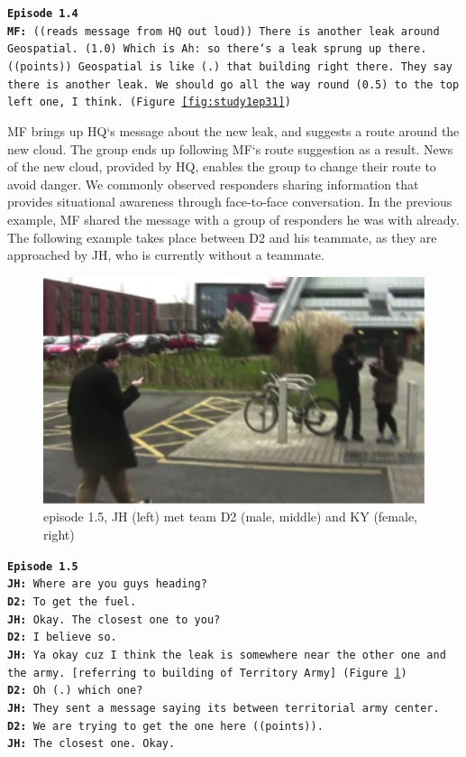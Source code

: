 \noindent
\texttt{\textbf{Episode 1.4}\\
\textbf{MF:} ((reads message from HQ out loud)) There is another leak around Geospatial. (1.0) Which is Ah: so there`s a leak sprung up there. ((points)) Geospatial is like (.) that building right there. They say there is another leak. We should go all the way round (0.5) to the top left one, I think. (Figure \ref{fig:study1ep31})\\
}

MF brings up HQ`s message about the new leak, and suggests a route around the new cloud. The group ends up following MF`s route suggestion as a result. News of the new cloud, provided by HQ, enables the group to change their route to avoid danger. We commonly observed responders sharing information that provides situational awareness through face-to-face conversation. In the previous example, MF shared the message with a group of responders he was with already. The following example takes place between D2 and his teammate, as they are approached by JH, who is currently without a teammate.\\

\begin{figure}[h]
  \centering
  \includegraphics[width=1\textwidth]{img/study1/ep4/ep41}
  \caption{episode 1.5, JH (left) met team D2 (male, middle) and KY (female, right)}
  \label{fig:study1ep41}
\end{figure}

\noindent
\texttt{\textbf{Episode 1.5}\\
\textbf{JH:} Where are you guys heading? \\
\textbf{D2:} To get the fuel.\\
\textbf{JH:} Okay. The closest one to you? \\
\textbf{D2:} I believe so.\\
\textbf{JH:} Ya okay cuz I think the leak is somewhere near the other one and the army. [referring to building of Territory Army] (Figure \ref{fig:study1ep41})\\
\textbf{D2:} Oh (.) which one?\\
\textbf{JH:} They sent a message saying its between territorial army center. 
\textbf{D2:} We are trying to get the one here ((points)).\\
\textbf{JH:} The closest one. Okay.\\
}


